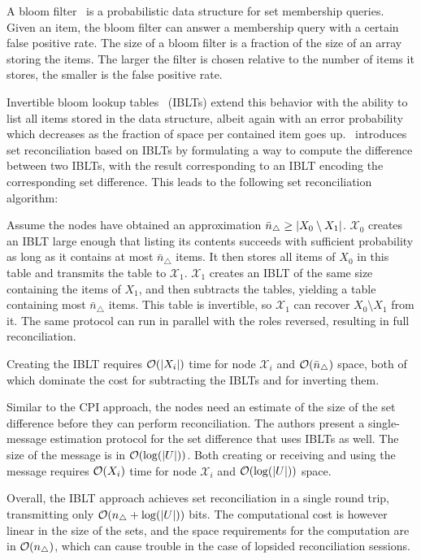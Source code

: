 A bloom filter~\cite{bloom1970space} is a probabilistic data structure for set membership queries. Given an item, the bloom filter can answer a membership query with a certain false positive rate. The size of a bloom filter is a fraction of the size of an array storing the items. The larger the filter is chosen relative to the number of items it stores, the smaller is the false positive rate.

Invertible bloom lookup tables~\cite{goodrich2011invertible} (IBLTs) extend this behavior with the ability to list all items stored in the data structure, albeit again with an error probability which decreases as the fraction of space per contained item goes up. \cite{eppstein2011s}~introduces set reconciliation based on IBLTs by formulating a way to compute the difference between two IBLTs, with the result corresponding to an IBLT encoding the corresponding set difference. This leads to the following set reconciliation algorithm:

Assume the nodes have obtained an approximation $\bar{n}_{\triangle} \geq |{X_0 \setminus X_1}|$. $\mathcal{X}_0$ creates an IBLT large enough that listing its contents succeeds with sufficient probability as long as it contains at most $\bar{n}_{\triangle}$ items. It then stores all items of $X_0$ in this table and transmits the table to $\mathcal{X}_1$. $\mathcal{X}_1$ creates an IBLT of the same size containing the items of $X_1$, and then subtracts the tables, yielding a table containing most $\bar{n}_{\triangle}$ items. This table is invertible, so $\mathcal{X}_1$ can recover $X_0 \setminus X_1$ from it. The same protocol can run in parallel with the roles reversed, resulting in full reconciliation.

Creating the IBLT requires $\mathcal{O}(|{X_i}|)$ time for node $\mathcal{X}_i$ and $\mathcal{O}(\bar{n}_{\triangle})$ space, both of which dominate the cost for subtracting the IBLTs and for inverting them.

Similar to the CPI approach, the nodes need an estimate of the size of the set difference before they can perform reconciliation. The authors present a single-message estimation protocol for the set difference that uses IBLTs as well. The size of the message is in $\mathcal{O}(\log(|{U}|))$. Both creating or receiving and using the message requires $\mathcal{O}(X_i)$ time for node $\mathcal{X}_i$ and $\mathcal{O}(\log(|{U}|))$ space.

Overall, the IBLT approach achieves set reconciliation in a single round trip, transmitting only $\mathcal{O}(n_{\triangle} + \log(|{U}|))$ bits. The computational cost is however linear in the size of the sets, and the space requirements for the computation are in $\mathcal{O}(n_{\triangle})$, which can cause trouble in the case of lopsided reconciliation sessions.

